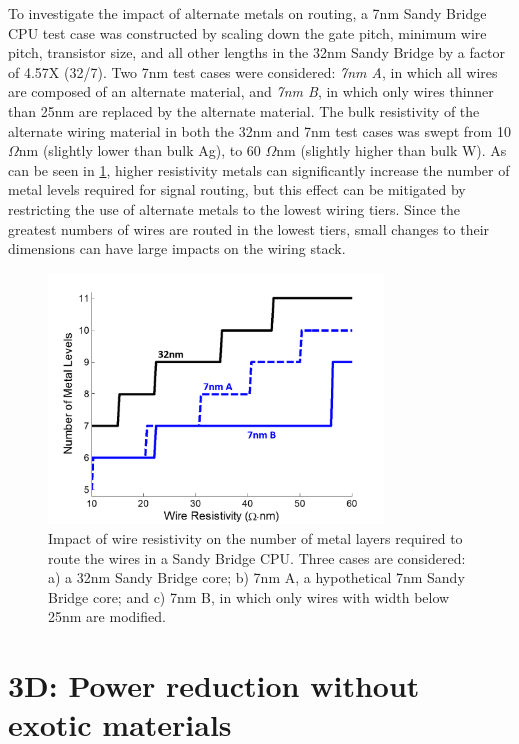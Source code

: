 \documentclass[journal,twoside]{IEEEtran}
\newcommand{\rechanged}[1]{\textcolor{red}{#1}}
\renewcommand{\rechanged}[1]{#1} %
\begin{document}
To investigate the impact of alternate metals on routing,
a 7nm Sandy Bridge CPU test case was constructed by scaling \rechanged{down} the gate pitch, 
minimum wire pitch, transistor size, and all other lengths in the 32nm Sandy Bridge
by a factor of 4.57X (32/7). Two 7nm test cases were considered: \textit{7nm A}, in which all wires are composed of an
alternate material, and \textit{7nm B}, in which only wires thinner than 25nm are replaced by the alternate material.
The bulk resistivity of the alternate wiring material 
in both the 32nm and 7nm test cases was swept from 10 $\Omega$nm (slightly lower than bulk Ag), to 60 $\Omega$nm 
(slightly higher than bulk W).
As can be seen in \cref{f-2d-materials-num-levels-rho-7nm}, higher resistivity metals can significantly
increase the number of metal levels required for signal routing, but this effect can
be mitigated by restricting the use of alternate metals to the lowest wiring tiers.
Since the greatest numbers of wires are routed in the lowest tiers, small changes to their dimensions
can have large impacts on the wiring stack.

\begin{figure}[tb]
	\centering
	\includegraphics[width=3.5in]{Figures/sb2d_32nm_vs_7nm_alt_metal_comparison.png}
	\caption{
		Impact of wire resistivity on the number of metal layers required to route the wires in a Sandy Bridge CPU. Three cases are
		considered: a) a 32nm Sandy Bridge core; b) 7nm A, a hypothetical
		7nm Sandy Bridge core; and c) 7nm B, in which only wires with width below 25nm are modified.
	}
	\label{f-2d-materials-num-levels-rho-7nm}
\end{figure}



\section{3D: Power reduction without exotic materials} \label{s-3d-investigations}
\end{document}
